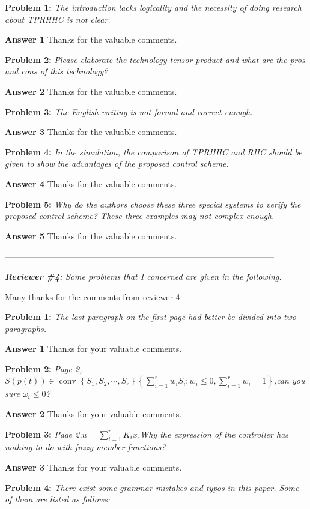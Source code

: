\documentclass[a4paper]{article}
\begin{document}
\textbf{Problem 1:} \textit{The introduction lacks logicality and the necessity of doing research about TPRHHC is not clear.}

\textbf{Answer 1} Thanks for the valuable comments.

\textbf{Problem 2:} \textit{Please elaborate the technology tensor product and what are the pros and cons of this technology?}

\textbf{Answer 2} Thanks for the valuable comments.

\textbf{Problem 3:} \textit{The English writing is not formal and correct enough. }

\textbf{Answer 3} Thanks for the valuable comments.

\textbf{Problem 4:} \textit{ In the simulation, the comparison of TPRHHC and RHC should be given to show the advantages of the proposed control scheme.}

\textbf{Answer 4} Thanks for the valuable comments.

\textbf{Problem 5:} \textit{Why do the authors choose these three special systems to verify the proposed control scheme? These three examples may not complex enough.}

\textbf{Answer 5} Thanks for the valuable comments.

------------------------------------------------------------------------------------------------

\textit{\textbf{Reviewer \#4:} Some problems that I concerned are given in the following.}

Many thanks for the comments from reviewer 4.

\textbf{Problem 1:} \textit{The last paragraph on the first page had better be divided into two paragraphs.}

\textbf{Answer 1} Thanks for your valuable comments.

\textbf{Problem 2:} \textit{Page 2,$S(p(t)) \in \operatorname{conv}\left\{S_{1}, S_{2}, \cdots,S_{r}\right\}\left\{\sum_{i=1}^{r} w_{i} S_{i}: w_{i} \leq 0, \sum_{i=1}^{r} w_{i}=1\right\}$,can you sure $\omega_i \leq 0$?}

\textbf{Answer 2} Thanks for your valuable comments.

\textbf{Problem 3:} \textit{Page 2,$u=\sum_{i=1}^{r} K_i x$,Why the expression of the controller has nothing to do with fuzzy member functions?}

\textbf{Answer 3} Thanks for your valuable comments.

\textbf{Problem 4:} \textit{There exist some grammar mistakes and typos in this paper. Some of them are listed as follows:}
\end{document}
